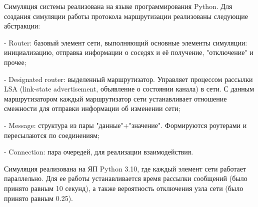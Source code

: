 Симуляция системы реализована на языке программирования Python. Для создания симуляции работы протокола маршрутизации реализованы следующие абстракции:

- Router: базовый элемент сети, выполняющий основные элементы симуляции: инициализацию, отправка информации о соседях и её получение, "отключение" и прочее;

- Designated router: выделенный маршрутизатор. Управляет процессом рассылки LSA (link-state advertisement, объявление о состоянии канала) в сети. С данным маршрутизатором каждый маршрутизатор сети устанавливает отношение смежности для отправки информации об изменении сети;

- Message: структура из пары "данные"+"значение". Формируются роутерами и пересылаются по соединениям;

- Connection: пара очередей, для реализации взаимодействия.

Симуляция реализована на ЯП Python 3.10, где каждый элемент сети работает параллельно. Для ее работы устанавливается время рассылки сообщений (было принято равным 10 секунд), а также вероятность отключения узла сети (было принято равным 0.25).
